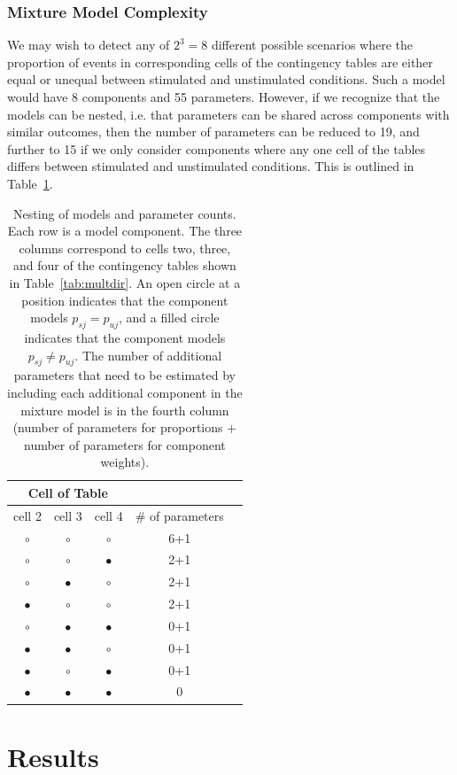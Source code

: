 \documentclass[11pt]{article}
\begin{document}
\subsubsection*{Mixture Model Complexity}
We may wish to detect any of $2^3 = 8$ different possible scenarios where the proportion of events in corresponding cells of the contingency tables are either equal or unequal between stimulated and unstimulated conditions. Such a model would have 8 components and 55 parameters. However, if we recognize that the models can be nested, i.e. that parameters can be shared across components with similar outcomes, then the number of parameters can be reduced to 19, and further to 15 if we only consider components where any one cell of the tables differs between stimulated and unstimulated conditions. This is outlined in Table~\ref{tab:nesting}.
\begin{table}
\centering
\parbox{0.8\linewidth}{\caption{Nesting of models and parameter counts. Each row is a model component. The three columns correspond to cells two, three, and four of the contingency tables shown in Table~\ref{tab:multdir}. An open circle at a position indicates that the component models $p_{sj}=p_{uj}$, and a filled circle indicates that the component models $p_{sj}\ne p_{uj}$. The number of additional parameters that need to be estimated by including each additional component in the mixture model is in the fourth column (number of parameters for proportions + number of parameters for component weights).}\label{tab:nesting}
\centering
\begin{tabular}{ccccc}
\multicolumn{3}{c}{Cell of Table}\\
\hline
cell 2&cell 3&cell 4&\# of parameters\\
\hline
$\circ$&$\circ$&$\circ$&6+1\\
$\circ$&$\circ$&$\bullet$&2+1\\
$\circ$&$\bullet$&$\circ$&2+1\\
$\bullet$&$\circ$&$\circ$&2+1\\
$\circ$&$\bullet$&$\bullet$&0+1\\
$\bullet$&$\bullet$&$\circ$&0+1\\
$\bullet$&$\circ$&$\bullet$&0+1\\
$\bullet$&$\bullet$&$\bullet$&0\\
\end{tabular}
}
\end{table}

\section*{Results}
\end{document}
